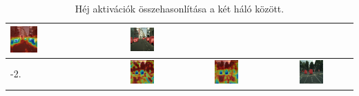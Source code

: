 \documentclass[12pt,oneside,a4paper]{article}
\theoremstyle{remark}
\begin{document}
\begin{table}[h!]
\begin{tabular}{|p{}|c|c|c|}
        \includegraphics[width=0.316\textwidth]{new_layer-3} &
        \includegraphics[width=0.316\textwidth]{bonn_000002_000019_leftImg8bit} \\
        \hline
        -2.&\includegraphics[width=0.316\textwidth]{old_layer-2} &
        \includegraphics[width=0.316\textwidth]{new_l-2} &
        \includegraphics[width=0.316\textwidth]{bonn_000001_000019_leftImg8bit} \\
        \hline
    \end{tabular}
    \caption{Héj aktivációk összehasonlítása a két háló között.}
    \label{tab:Activations}
\end{table}
\end{document}
